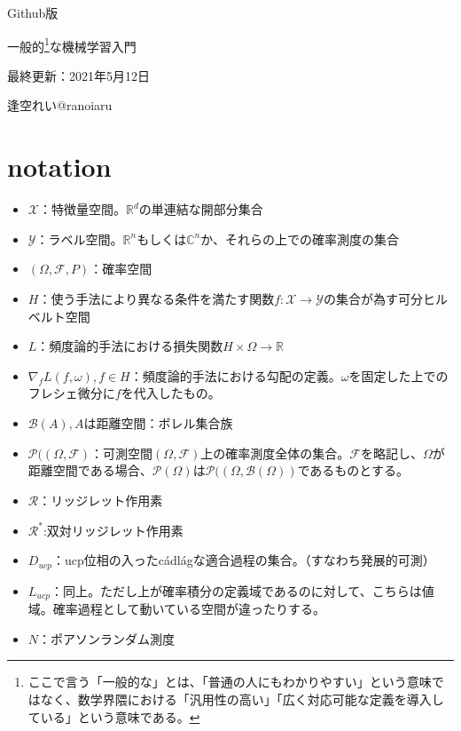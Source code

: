 \documentclass{jsarticle}
\begin{document}
\begin{center}
  
  \Huge Github版 \par
  \vspace{15mm}
  \Huge 一般的\footnote{ここで言う「一般的な」とは、「普通の人にもわかりやすい」という意味ではなく、数学界隈における「汎用性の高い」「広く対応可能な定義を導入している」という意味である。}な機械学習入門\par
  \vspace{90mm}
  \Large 最終更新：2021年5月12日 \par
  \Large 逢空れい@ranoiaru\par

\end{center}
\thispagestyle{empty}
\clearpage
\addtocounter{page}{-1}







\newpage


 \tableofcontents
 \clearpage
\section*{notation}
\begin{itemize}
\item $\mathcal{X}$：特徴量空間。$\mathbb{R}^d$の単連結な開部分集合
\item $\mathcal{Y}$：ラベル空間。$\mathbb{R}^n$もしくは$\mathbb{C}^n$か、それらの上での確率測度の集合
\item $(\Omega,\mathcal{F},P)$：確率空間
\item $H$：使う手法により異なる条件を満たす関数$f:\mathcal{X}\to\mathcal{Y}$の集合が為す可分ヒルベルト空間
\item $L$：頻度論的手法における損失関数$H\times\Omega \to \mathbb{R}$
\item $\nabla_f L(f,\omega),f\in H$：頻度論的手法における勾配の定義。$\omega$を固定した上でのフレシェ微分に$f$を代入したもの。
\item $\mathcal{B}(A),A$は距離空間：ボレル集合族
\item $\mathcal{P}((\Omega,\mathcal{F})$：可測空間$(\Omega,\mathcal{F})$上の確率測度全体の集合。$\mathcal{F}$を略記し、$\Omega$が距離空間である場合、$\mathcal{P}(\Omega)$は$\mathcal{P}((\Omega,\mathcal{B}(\Omega))$であるものとする。
\item $\mathcal{R}$：リッジレット作用素
\item $\mathcal{R}^*$:双対リッジレット作用素
\item $D_{ucp}$：ucp位相の入ったc\'{a}dl\'{a}gな適合過程の集合。（すなわち発展的可測）
\item $L_{ucp}$：同上。ただし上が確率積分の定義域であるのに対して、こちらは値域。確率過程として動いている空間が違ったりする。
\item $N$：ポアソンランダム測度
\end{itemize}
\end{document}
